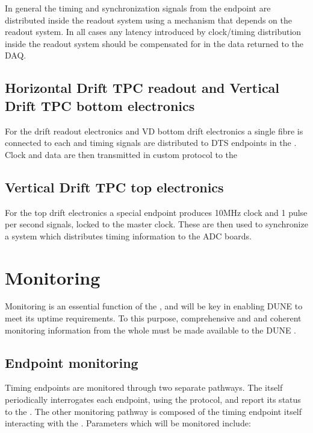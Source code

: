 \documentclass{dune}
\begin{document}
In general the timing and synchronization signals from the  endpoint are distributed inside the readout system using a mechanism that depends on the readout system. In all cases any latency introduced by clock/timing distribution inside the readout system should be compensated for in the data returned to the DAQ.

\subsection{Horizontal Drift TPC readout and Vertical Drift TPC bottom electronics}


For the  drift readout electronics and VD bottom drift electronics a single fibre is connected to each  and timing signals are distributed to DTS endpoints in the . Clock and data are then transmitted in custom protocol to the 

\subsection{Vertical Drift TPC top electronics}

For the  top drift electronics a special  endpoint produces 10MHz clock and 1 pulse per second signals, locked to the  master clock. These are then used to synchronize a  system\cite{wr_ohwr} which distributes timing information to the ADC boards.

\section{Monitoring}
Monitoring is an essential function of the , and will be key in enabling DUNE to meet its uptime requirements. To this purpose, comprehensive and and coherent monitoring information from the whole  must be made available to the DUNE .

\subsection{Endpoint monitoring}
Timing endpoints are monitored through two separate pathways. The  itself periodically interrogates each endpoint, using the  protocol, and report its status to the . The other monitoring pathway is composed of the timing endpoint itself interacting with the . Parameters which will be monitored include:
\end{document}
